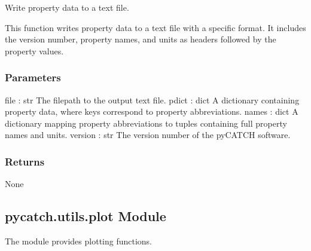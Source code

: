 \documentclass[letterpaper,10pt,english]{sphinxmanual}
\begin{document}

\begin{fulllineitems}
\label{\detokenize{pycatch/utils/extensions:pycatch.utils.extensions.printtxt}}
\pysigstartsignatures
{}
\pysigstopsignatures
\sphinxAtStartPar
Write property data to a text file.

\sphinxAtStartPar
This function writes property data to a text file with a specific format. It includes the version number,
property names, and units as headers followed by the property values.


\subsubsection{Parameters}
\label{\detokenize{pycatch/utils/extensions:id8}}
\sphinxAtStartPar
file : str
The filepath to the output text file.
pdict : dict
A dictionary containing property data, where keys correspond to property abbreviations.
names : dict
A dictionary mapping property abbreviations to tuples containing full property names and units.
version : str
The version number of the pyCATCH software.


\subsubsection{Returns}
\label{\detokenize{pycatch/utils/extensions:id9}}
\sphinxAtStartPar
None

\end{fulllineitems}


\sphinxstepscope


\subsection{pycatch.utils.plot Module}
\label{\detokenize{pycatch/utils/plot:pycatch-utils-plot-module}}\label{\detokenize{pycatch/utils/plot::doc}}
\sphinxAtStartPar
The  module provides plotting functions.

\label{\detokenize{pycatch/utils/plot:module-pycatch.utils.plot}}
\end{document}
